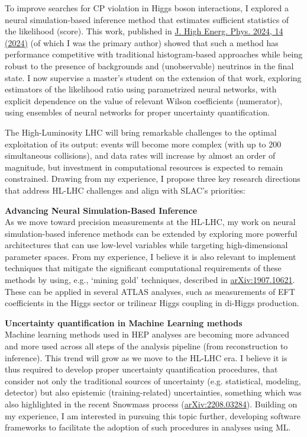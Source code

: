 \documentclass[11pt, a4paper]{awesome-cv}
\begin{document}
\begin{cvletter}
  To improve searches for CP violation in Higgs boson interactions, I explored a neural simulation-based inference method that estimates sufficient statistics of the likelihood (score). This work, published in \href{https://doi.org/10.1007/JHEP04(2024)014}{J. High Energ. Phys. 2024, 14 (2024)} (of which I was the primary author) showed that such a method has performance competitive with traditional histogram-based approaches while being robust to the presence of backgrounds and (unobservable) neutrinos in the final state. I now supervise a master's student on the extension of that work, exploring estimators of the likelihood ratio using parametrized neural networks, with explicit dependence on the value of relevant Wilson coefficients (numerator), using ensembles of neural networks for proper uncertainty quantification.
  
  
  The High-Luminosity LHC will bring remarkable challenges to the optimal exploitation of its output: events will become more complex (with up to 200 simultaneous collisions), and data rates will increase by almost an order of magnitude, but investment in computational resources is expected to remain constrained. Drawing from my experience, I propose three key research directions that address HL-LHC challenges and align with SLAC's priorities:
  
  \textbf{Advancing Neural Simulation-Based Inference}\\
  As we move toward precision measurements at the HL-LHC, my work on neural simulation-based inference methods can be extended by exploring more powerful architectures that can use low-level variables while targeting high-dimensional parameter spaces. From my experience, I believe it is also relevant to implement techniques that mitigate the significant computational requirements of these methods by using, e.g., `mining gold' techniques, described in \href{https://arxiv.org/abs/1907.10621}{arXiv:1907.10621}. These can be applied in several ATLAS analyses, such as measurements of EFT coefficients in the Higgs sector or trilinear Higgs coupling in di-Higgs production.
  
  \textbf{Uncertainty quantification in Machine Learning methods}\\
  Machine learning methods used in HEP analyses are becoming more advanced and more used across all steps of the analysis pipeline (from reconstruction to inference). This trend will grow as we move to the HL-LHC era. I believe it is thus required to develop proper uncertainty quantification procedures, that consider not only the traditional sources of uncertainty (e.g. statistical, modeling, detector) but also epistemic (training-related) uncertainties, something which was also highlighted in the recent Snowmass process (\href{https://arxiv.org/abs/2208.03284}{arXiv:2208.03284}). Building on my experience, I am interested in pursuing this topic further, developing software frameworks to facilitate the adoption of such procedures in analyses using ML.
  

\end{cvletter}
\end{document}
